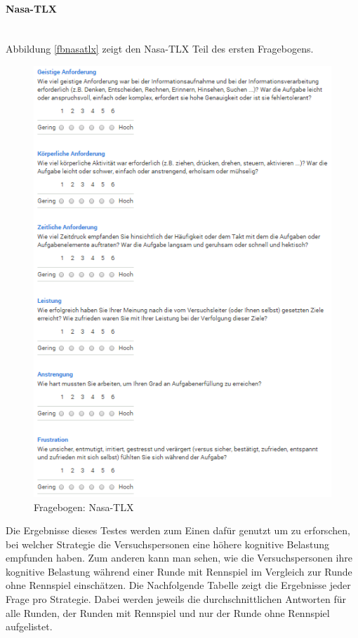 \documentclass[12pt,a4paper]{scrartcl}
\begin{document}
\paragraph{Nasa-TLX}
~\\
Abbildung \ref{fbnasatlx} zeigt den Nasa-TLX Teil des ersten Fragebogens. 
\begin{figure}[htbp]
\begin{center}
\includegraphics[width=12cm]{nasa.png}
\caption{Fragebogen: Nasa-TLX}
\label{fbnasatlx1}
\end{center}
\end{figure}
Die Ergebnisse dieses Testes werden zum Einen dafür genutzt um zu erforschen, bei welcher Strategie die Versuchspersonen eine höhere kognitive Belastung empfunden haben. Zum anderen kann man sehen, wie die Versuchspersonen ihre kognitive Belastung während einer Runde mit Rennspiel im Vergleich zur Runde ohne Rennspiel einschätzen. 
Die Nachfolgende Tabelle zeigt die Ergebnisse jeder Frage pro Strategie. Dabei werden jeweils die durchschnittlichen Antworten für alle Runden, der Runden mit Rennspiel und nur der Runde ohne Rennspiel aufgelistet. 
\end{document}
